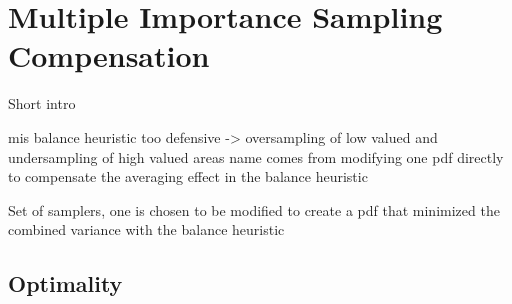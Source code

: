 \chapter{Multiple Importance Sampling Compensation}
\label{ch:mis_compensation}
Short intro

mis balance heuristic too defensive -> oversampling of low valued and undersampling of high valued areas
name comes from modifying one pdf directly to compensate the averaging effect in the balance heuristic

Set of samplers, one is chosen to be modified to create a pdf that minimized the combined variance with the balance heuristic





\section{Optimality}
\label{sec:misc_optimality}

